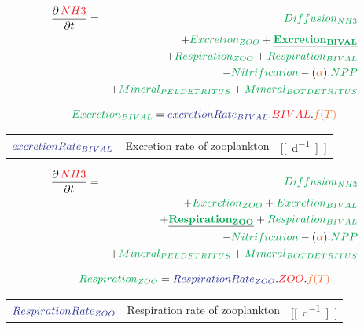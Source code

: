 \documentclass[final,xcolor=dvipsnames]{beamer}
\begin{document}
      \begin{frame}   
	\begin{exampleblock}{}
	  \begin{eqnarray*}
	    \small
	    \frac{\partial\,\varC[NH3]}{\partial t} & = & \proC[Diffusion_{NH3}] \\
	    & & +  \proC[Excretion_{ZOO}] + \underline{\mathbf{\proC[Excretion_{BIVAL}]}} \\
	    & &+ \proC[Respiration_{ZOO}] + \proC[Respiration_{BIVAL}]\\
	    & & - \proC[Nitrification]  - (\worC[\alpha]).\proC[NPP] \\
	    & & + \proC[Mineral_{PELDETRITUS}] + \proC[Mineral_{BOTDETRITUS}] \\
	  \end{eqnarray*}
	\end{exampleblock}
	\begin{exampleblock}{}
	  \begin{equation*}
	    \proC[Excretion_{BIVAL}] = \parC[excretionRate_{BIVAL}] . \varC[BIVAL] .\worC[f(T)]
	  \end{equation*}
	  \begin{tabular}{ l l l }
	    $\parC[excretionRate_{BIVAL}]$ &  Excretion rate of zooplankton &  [\unit[d^{-1}]] 
	  \end{tabular}
	    \end{exampleblock}
      \end{frame}
      
            \begin{frame}   
	\begin{exampleblock}{}
	  \begin{eqnarray*}
	    \small
	    \frac{\partial\,\varC[NH3]}{\partial t} & = & \proC[Diffusion_{NH3}] \\
	    & & +  \proC[Excretion_{ZOO}] + \proC[Excretion_{BIVAL}] \\
	& &+ \underline{\mathbf{\proC[Respiration_{ZOO}]}} + \proC[Respiration_{BIVAL}]\\
	    & & - \proC[Nitrification]  - (\worC[\alpha]).\proC[NPP] \\
	    & & + \proC[Mineral_{PELDETRITUS}] + \proC[Mineral_{BOTDETRITUS}] \\
	  \end{eqnarray*}
	\end{exampleblock}
	\begin{exampleblock}{}
	  \begin{equation*}
	    \proC[Respiration_{ZOO}] = \parC[RespirationRate_{ZOO}] . \varC[ZOO] .\worC[f(T)]
	  \end{equation*}
	  \begin{tabular}{ l l l }
	    $\parC[RespirationRate_{ZOO}]$ &  Respiration rate of zooplankton &  [\unit[d^{-1}]] 
	  \end{tabular}
	    \end{exampleblock}
      \end{frame}
      
\end{document}
